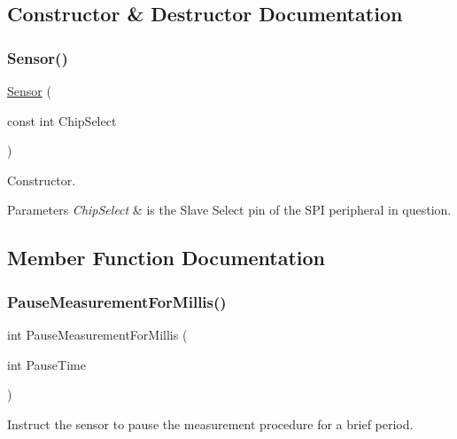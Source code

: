 \subsection{Constructor \& Destructor Documentation}
\mbox{\label{class_sensor_a370005d04d3566c21b9190e1442fa4e8}} 
\subsubsection{\texorpdfstring{Sensor()}{Sensor()}}
{\footnotesize\ttfamily \mbox{\hyperlink{class_sensor}{Sensor}} (\begin{DoxyParamCaption}\item[{const int}]{Chip\+Select }\end{DoxyParamCaption})}



Constructor. 


\begin{DoxyParams}{Parameters}
{\em Chip\+Select} & is the Slave Select pin of the S\+PI peripheral in question. \\
\hline
\end{DoxyParams}


\subsection{Member Function Documentation}
\mbox{\label{class_sensor_afdcc3b63357bd24f519e0cbc85454a52}} 
\subsubsection{\texorpdfstring{PauseMeasurementForMillis()}{PauseMeasurementForMillis()}}
{\footnotesize\ttfamily int Pause\+Measurement\+For\+Millis (\begin{DoxyParamCaption}\item[{int}]{Pause\+Time }\end{DoxyParamCaption})}



Instruct the sensor to pause the measurement procedure for a brief period. 

